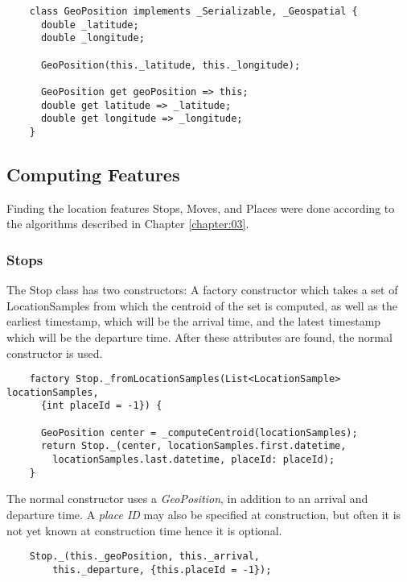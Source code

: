 \begin{verbatim}
    class GeoPosition implements _Serializable, _Geospatial {
      double _latitude;
      double _longitude;
    
      GeoPosition(this._latitude, this._longitude);
    
      GeoPosition get geoPosition => this;
      double get latitude => _latitude;
      double get longitude => _longitude;
    }
\end{verbatim}


\subsection{Computing Features}
\label{subsection:finding-features}
Finding the location features Stops, Moves, and Places  were done according to the algorithms described in Chapter \ref{chapter:03}. 

\subsubsection*{Stops}
The Stop class has two constructors: A factory constructor which takes a set of LocationSamples from which the centroid of the set is computed, as well as the earliest timestamp, which will be the arrival time, and the latest timestamp which will be the departure time. After these attributes are found, the normal constructor is used.

\begin{verbatim}
    factory Stop._fromLocationSamples(List<LocationSample> locationSamples,
      {int placeId = -1}) {
      
      GeoPosition center = _computeCentroid(locationSamples);
      return Stop._(center, locationSamples.first.datetime,
        locationSamples.last.datetime, placeId: placeId);
    }
\end{verbatim}

The normal constructor uses a \textit{GeoPosition}, in addition to an arrival and departure time. A \textit{place ID }may also be specified at construction, but often it is not yet known at construction time hence it is optional.

\begin{verbatim}
    Stop._(this._geoPosition, this._arrival, 
        this._departure, {this.placeId = -1});
\end{verbatim}

